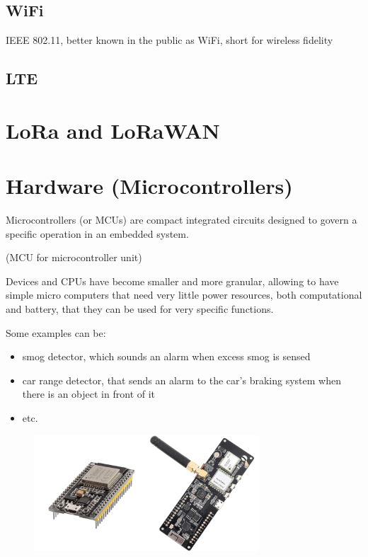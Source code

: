 	\subsection{WiFi}

	IEEE 802.11, better known in the public as WiFi, short for wireless fidelity
	
	\subsection{LTE}
	

\section{LoRa and LoRaWAN}

	
	
\section{Hardware (Microcontrollers)}

	Microcontrollers (or MCUs) are compact integrated circuits designed to govern a specific operation in an embedded system.
	
	(MCU for microcontroller unit)
	
	Devices and CPUs have become smaller and more granular, allowing to have simple micro computers that need very little power resources, both computational and battery, that they can be used for very specific functions.
	
	Some examples can be:
	\begin{itemize}
		\item smog detector, which sounds an alarm when excess smog is sensed
		\item car range detector, that sends an alarm to the car's braking system when there is an object in front of it
		\item etc.
	\end{itemize}

	\begin{figure}
		\centering
		\includegraphics[width=0.75\textwidth]{resources/img/chap3/generic_board}
		\caption{}
	\end{figure}

